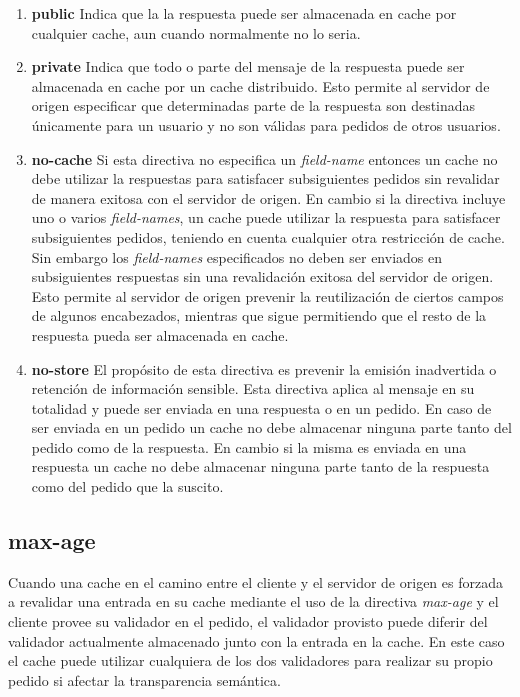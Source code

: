 \documentclass[a4paper,12pt]{report}
\begin{document}
\begin{enumerate}
  \item \textbf{public} Indica que la la respuesta puede ser almacenada en cache por cualquier cache, aun cuando normalmente no lo seria.
  \item \textbf{private} Indica que todo o parte del mensaje de la respuesta puede ser almacenada en cache por un cache distribuido. Esto
  permite al servidor de origen especificar que determinadas parte de la respuesta son destinadas únicamente para un usuario y no son válidas para pedidos de otros usuarios.
  \item \textbf{no-cache} Si esta directiva no especifica un \emph{field-name} entonces un cache no debe utilizar la respuestas para satisfacer subsiguientes pedidos sin
  revalidar de manera exitosa con el servidor de origen. En cambio si la directiva incluye uno o varios \emph{field-names}, un cache puede utilizar la respuesta para
  satisfacer subsiguientes pedidos, teniendo en cuenta cualquier otra restricción de cache. Sin embargo los \emph{field-names} especificados no deben ser enviados en subsiguientes
  respuestas sin una revalidación exitosa del servidor de origen. Esto permite al servidor de origen prevenir la reutilización de ciertos campos de algunos encabezados, mientras
  que sigue permitiendo que el resto de la respuesta pueda ser almacenada en cache.
  \item \textbf{no-store} El propósito de esta directiva es prevenir la emisión inadvertida o retención de información sensible. Esta directiva aplica al mensaje en su
  totalidad y puede ser enviada en una respuesta o en un pedido. En caso de ser enviada en un pedido un cache no debe almacenar ninguna parte tanto del pedido como de la
  respuesta. En cambio si la misma es enviada en una respuesta un cache no debe almacenar ninguna parte tanto de la respuesta como del pedido que la suscito.
\end{enumerate}

\subsection{max-age}
Cuando una cache en el camino entre el cliente y el servidor de origen es forzada a revalidar una entrada en su cache mediante el uso de la directiva \emph{max-age} y el
cliente provee su validador en el pedido, el validador provisto puede diferir del validador actualmente almacenado junto con la entrada en la cache. En este caso el
cache puede utilizar cualquiera de los dos validadores para realizar su propio pedido si afectar la transparencia semántica.
\end{document}
